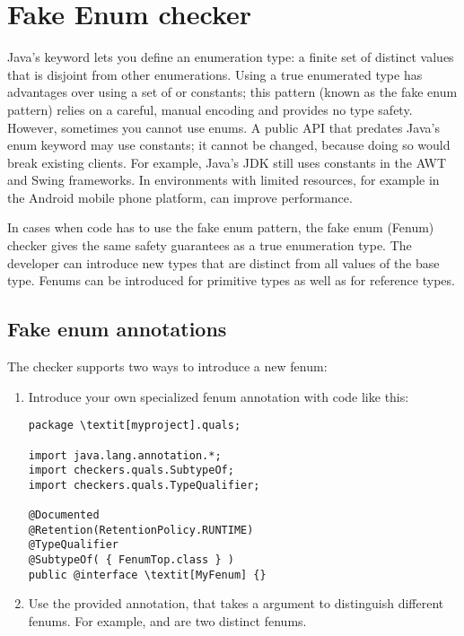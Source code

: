 \htmlhr
\chapter{Fake Enum checker\label{fenum-checker}}

Java's 
keyword lets you define an enumeration type: a finite set of distinct values
that is disjoint from other enumerations.
Using a true enumerated type has advantages over using a set of  or
 constants; this pattern (known as the fake enum pattern) relies on
a careful, manual encoding and provides no type safety.
However, sometimes you cannot use enums.
A public API that predates Java's enum keyword may use  constants;
it cannot be changed, because doing so would break existing clients.
For example, Java's JDK still uses  constants in the AWT and Swing
frameworks.
In environments with limited resources, for example in the Android mobile phone
platform,
can improve performance.

In cases when code has to use the fake enum pattern, the fake enum (Fenum)
checker gives the same safety guarantees as a true enumeration type. 
The developer can introduce new types that are distinct from all values of the
base type. Fenums can be introduced for primitive types as well as for reference types.


\section{Fake enum annotations}

The checker supports two ways to introduce a new fenum:

\begin{enumerate}
\item Introduce your own specialized fenum annotation with code like this:

\begin{Verbatim}[commandchars=\\\[\]]
package \textit[myproject].quals;

import java.lang.annotation.*;
import checkers.quals.SubtypeOf;
import checkers.quals.TypeQualifier;

@Documented
@Retention(RetentionPolicy.RUNTIME)
@TypeQualifier
@SubtypeOf( { FenumTop.class } )
public @interface \textit[MyFenum] {}
\end{Verbatim}

\item Use the provided  annotation, that takes a
 argument to distinguish different fenums.
For example,  and  are two distinct fenums.
\end{enumerate}


